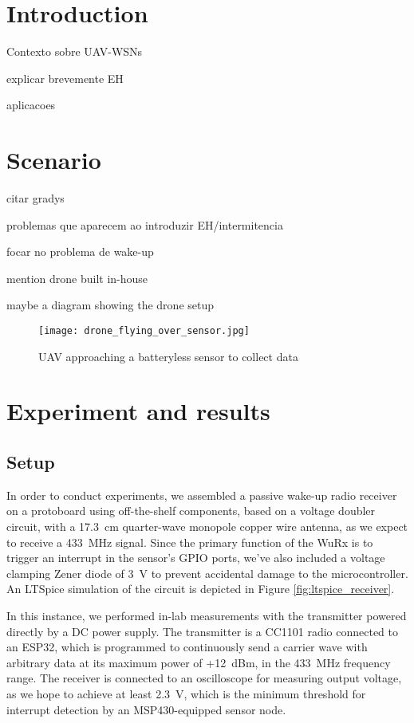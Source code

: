 \documentclass[conference]{IEEEtran}
\begin{document}
\section{Introduction}

Contexto sobre UAV-WSNs

explicar brevemente EH

aplicacoes


\section{Scenario}

citar gradys

problemas que aparecem ao introduzir EH/intermitencia

focar no problema de wake-up

mention drone built in-house

maybe a diagram showing the drone setup

\begin{figure}[htbp]
  \centerline{\texttt{[image: drone\_flying\_over\_sensor.jpg]}}
  \caption{UAV approaching a batteryless sensor to collect data}
  \label{fig:drone_over_sensor}
\end{figure}


\section{Experiment and results}

\subsection{Setup}

In order to conduct experiments, we assembled a passive wake-up radio receiver on a protoboard using off-the-shelf components, based on a voltage doubler circuit, with a 17.3~cm quarter-wave monopole copper wire antenna, as we expect to receive a 433~MHz signal. Since the primary function of the WuRx is to trigger an interrupt in the sensor's GPIO ports, we've also included a voltage clamping Zener diode of 3~V to prevent accidental damage to the microcontroller. An LTSpice simulation of the circuit is depicted in Figure \ref{fig:ltspice_receiver}.

In this instance, we performed in-lab measurements with the transmitter powered directly by a DC power supply. The transmitter is a CC1101 radio connected to an ESP32, which is programmed to continuously send a carrier wave with arbitrary data at its maximum power of +12~dBm, in the 433~MHz frequency range. The receiver is connected to an oscilloscope for measuring output voltage, as we hope to achieve at least 2.3~V, which is the minimum threshold for interrupt detection by an MSP430-equipped sensor node.
\end{document}
